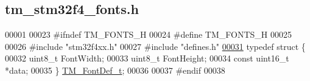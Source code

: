 \hypertarget{tm__stm32f4__fonts_8h_source}{}\subsection{tm\+\_\+stm32f4\+\_\+fonts.\+h}

\begin{DoxyCode}
00001 
00023 \textcolor{preprocessor}{#ifndef TM\_FONTS\_H}
00024 \textcolor{preprocessor}{#define TM\_FONTS\_H}
00025 
00026 \textcolor{preprocessor}{#include "stm32f4xx.h"}
00027 \textcolor{preprocessor}{#include "defines.h"}
\hypertarget{tm__stm32f4__fonts_8h_source_l00031}{}\hyperlink{struct_t_m___font_def__t}{00031} \textcolor{keyword}{typedef} \textcolor{keyword}{struct }\{
00032     uint8\_t FontWidth;
00033     uint8\_t FontHeight;
00034     \textcolor{keyword}{const} uint16\_t *data;
00035 \} \hyperlink{struct_t_m___font_def__t}{TM\_FontDef\_t};
00036 
00037 \textcolor{preprocessor}{#endif}
00038 
\end{DoxyCode}
